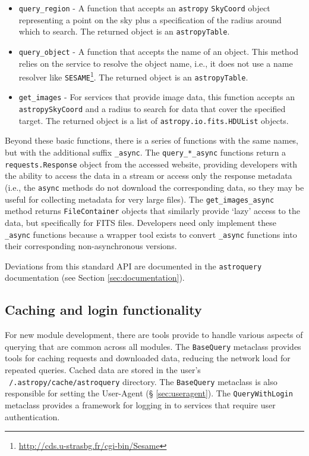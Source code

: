 \documentclass[twocolumn]{aastex62}
\newcommand{\package}[1]{\texttt{#1}\xspace}
\newcommand{\astroquery}{\package{astroquery}}
\newcommand{\astropypkg}{\package{astropy}}
\begin{document}
\begin{itemize}
    \item \texttt{query\_region} - A function that accepts an \astropypkg
        \texttt{SkyCoord} object representing a point on the sky plus a
        specification of the radius around which to search.
        The returned object is an \astropypkg \texttt{Table}.
    \item \texttt{query\_object} - A function that accepts the name of an
        object.  This method relies on the service to resolve the object name, i.e., it does not use a name resolver
        like \texttt{SESAME}\footnote{\url{http://cds.u-strasbg.fr/cgi-bin/Sesame}}.
        The returned object is an \astropypkg \texttt{Table}.
    \item \texttt{get\_images} - For services that provide image data, this
        function accepts an \astropypkg \texttt{SkyCoord} and a radius to search for data
        that cover the specified target. The returned object is a list
        of \texttt{astropy.io.fits.HDUList} objects.
\end{itemize}

Beyond these basic functions, there is a series of functions with the same
names, but with the additional suffix \texttt{\_async}.  The
\texttt{query\_*\_async} functions return a \texttt{requests.Response} object
from the accessed website, providing developers with
the ability to access the data in a stream or access only the response
metadata (i.e., the \texttt{async} methods do not download the corresponding
data, so they may be useful for collecting metadata for very large files).  The
\texttt{get\_images\_async} method returns
\texttt{FileContainer} objects that similarly provide `lazy' access to the
data, but specifically for FITS files.  Developers need only implement
these \texttt{\_async} functions because a wrapper tool exists to convert
\texttt{\_async} functions into their corresponding non-asynchronous versions.

Deviations from this standard API are documented in the \astroquery
documentation (see Section \ref{sec:documentation}).

\subsection{Caching and login functionality}
For new module development, there are tools provide to handle various aspects
of querying that are common across all modules.  The \texttt{BaseQuery}
metaclass provides tools for caching requests and downloaded data, reducing the
network load for repeated queries.  Cached data are stored in the user's
\texttt{~/.astropy/cache/astroquery} directory.  The \texttt{BaseQuery}
metaclass is also responsible for setting the User-Agent (\S
\ref{sec:useragent}).  The \texttt{QueryWithLogin} metaclass provides a
framework for logging in to services that require user
authentication.
\end{document}
